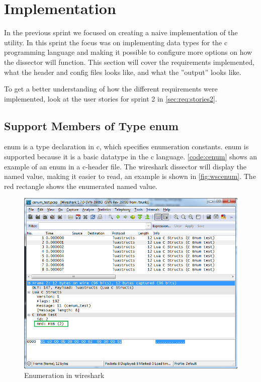 \section{Implementation}
\label{sec:sp2:impl}
In the previous sprint we focused on creating a naive implementation of the 
\gls{utility}. In this sprint the focus was on implementing data types for the 
\Gls{c} programming language and making it possible to configure more options on how 
the \gls{dissector} will function. This section will cover the requirements 
implemented, what the \gls{header} and config files looks like, and what the ''output'' looks like.

To get a better understanding of how the different requirements were implemented,
look at the user stories for sprint 2 in \autoref{sec:req:stories2}.

\subsection{Support Members of Type \gls{enum}}

\label{sec:supportenum}
\Gls{enum} is a type declaration in \Gls{c}, which specifies enumeration constants.  \Gls{enum} 
is supported because it is a basic datatype in the \Gls{c} language. 
\autoref{code:cenum} shows an example of an \gls{enum} in a \Gls{c}-\gls{header} file. The 
\Gls{wireshark} \gls{dissector} will display the named value, making it 
easier to read, an example is shown in \autoref{fig:wscenum}. The red 
rectangle shows the \gls{enumerated named value}.

\begin{figure}[ht]
	\center
	\includegraphics[width=\textwidth]{./sprints/img/wireshark_cenum}
	\caption{Enumeration in \Gls{wireshark}\label{fig:wscenum}}
\end{figure}

